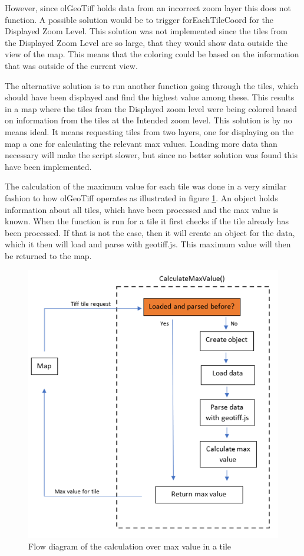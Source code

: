 
However, since olGeoTiff holds data from an incorrect zoom layer this does not function. A possible solution would be to trigger forEachTileCoord for the Displayed Zoom Level. This solution was not implemented since the tiles from the Displayed Zoom Level are so large, that they would show data outside the view of the map. This means that the coloring could be based on the information that was outside of the current view.

The alternative solution is to run another function going through the tiles, which should have been displayed and find the highest value among these. This results in a map where the tiles from the Displayed zoom level were being colored based on information from the tiles at the Intended zoom level. This solution is by no means ideal. It means requesting tiles from two layers, one for displaying on the map a one for calculating the relevant max values. Loading more data than necessary will make the script slower, but since no better solution was found this have been implemented.

The calculation of the maximum value for each tile was done in a very similar fashion to how olGeoTiff operates as illustrated in figure \ref{CalculateMaxValue}. An object holds information about all tiles, which have been processed and the max value is known. When the function is run for a tile it first checks if the tile already has been processed. If that is not the case, then it will create an object for the data, which it then will load and parse with geotiff.js. %
This maximum value will then be returned to the map. 

\begin{figure} [H]
	\centering
	\includegraphics[width=.6\textwidth]{Pictures/CalculateMaxValue}
	\caption{Flow diagram of the calculation over max value in a tile}
	\label{CalculateMaxValue}
\end{figure}



